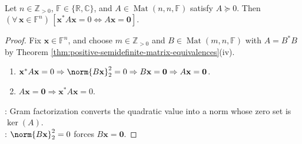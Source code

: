 \begin{illustrationfigure}[H]
  \centering
  
  \caption{For $A=B^*B$, the squared-norm identity certifies $\ker(A)=\ker(B)$.}
  \label{fig:psd-factorization-kernel}
\end{illustrationfigure}

\begin{corollary} \label{cor:positive-semidefinite-zero-quadratic-form} \\
Let $n\in\mathbb{Z}_{>0}$, $\mathbb{F}\in\{\mathbb{R},\mathbb{C}\}$, and $A\in\operatorname{Mat}(n,n,\mathbb{F})$ satisfy $A\succeq0$. Then $(\forall\,\mathbf{x}\in\mathbb{F}^n)\,[\mathbf{x}^*A\mathbf{x}=0\Longleftrightarrow A\mathbf{x}=\mathbf{0}]$.
\begin{proof}
Fix $\mathbf{x}\in\mathbb{F}^n$, and choose $m\in\mathbb{Z}_{>0}$ and $B\in\operatorname{Mat}(m,n,\mathbb{F})$ with $A=B^*B$ by Theorem \ref{thm:positive-semidefinite-matrix-equivalences}(iv).
\begin{enumerate}[label=\roman*.]
\setlength{\itemsep}{0pt}
\item[$(\Rightarrow)$] $\mathbf{x}^*A\mathbf{x}=0\Rightarrow\norm{B\mathbf{x}}_2^2=0\Rightarrow B\mathbf{x}=\mathbf{0}\Rightarrow A\mathbf{x}=\mathbf{0}$.
\item[$(\Leftarrow)$] $A\mathbf{x}=\mathbf{0}\Rightarrow\mathbf{x}^*A\mathbf{x}=0$.
\end{enumerate}
: Gram factorization converts the quadratic value into a norm whose zero set is $\ker(A)$.\\
: $\norm{B\mathbf{x}}_2^2=0$ forces $B\mathbf{x}=\mathbf{0}$.
\end{proof}
\end{corollary}

